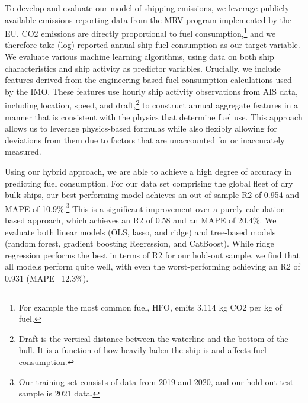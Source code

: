 To develop and evaluate our model of shipping emissions, we leverage publicly available emissions reporting data from the \ac{MRV} program implemented by the \ac{EU}. \Ac{CO2} emissions are directly proportional to fuel consumption,\footnote{For example the most common fuel, \ac{HFO}, emits 3.114 kg \ac{CO2} per kg of fuel.} and we therefore take (log) reported annual ship fuel consumption as our target variable. We evaluate various machine learning algorithms, using data on both ship characteristics and ship activity as predictor variables. Crucially, we include features derived from the engineering-based fuel consumption calculations used by the \ac{IMO}. These features use hourly ship activity observations from \ac{AIS} data, including location, speed, and draft,\footnote{Draft is the vertical distance between the waterline and the bottom of the hull. It is a function of how heavily laden the ship is and affects fuel consumption.} to construct annual aggregate features in a manner that is consistent with the physics that determine fuel use. This approach allows us to leverage physics-based formulas while also flexibly allowing for deviations from them due to factors that are unaccounted for or inaccurately measured.

Using our hybrid approach, we are able to achieve a high degree of accuracy in predicting fuel consumption. For our data set comprising the global fleet of dry bulk ships, our best-performing model achieves an out-of-sample \ac{R2} of 0.954 and \ac{MAPE} of 10.9\%.\footnote{Our training set consists of data from 2019 and 2020, and our hold-out test sample is 2021 data.} This is a significant improvement over a purely calculation-based approach, which achieves an \ac{R2} of 0.58 and an \ac{MAPE} of 20.4\%. We evaluate both linear models (\ac{OLS}, lasso, and ridge) and tree-based models (random forest, gradient boosting Regression, and CatBoost). While ridge regression performs the best in terms of \ac{R2} for our hold-out sample, we find that all models perform quite well, with even the worst-performing achieving an \ac{R2} of 0.931 (\ac{MAPE}=12.3\%).


